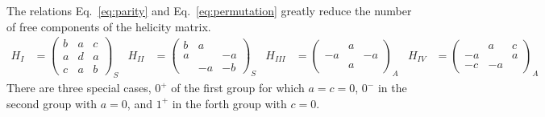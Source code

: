 \documentclass[prd,preprintnumbers,floatfix,
nofootinbib,superscriptaddress]{revtex4}
\newcommand{\I}{\ensuremath{I}}
\newcommand{\II}{\ensuremath{{I\!I}}}
\newcommand{\III}{\ensuremath{{I\!I\!I}}}
\newcommand{\IV}{\ensuremath{{I\!V}}}
\begin{document}
The relations Eq.~\eqref{eq:parity} and Eq.~\eqref{eq:permutation} greatly reduce the number of free components of the helicity matrix.
\begin{align}
  H_\I&=\begin{pmatrix}
    b & a & c\\
    a & d & a\\
    c & a & b
  \end{pmatrix}_S&
  H_\II&=\begin{pmatrix}
    b & a &  \\
    a &   & -a\\
      & -a & -b
  \end{pmatrix}_S&
  H_{\III}&=\begin{pmatrix}
      & a &  \\
    -a &   & -a\\
      & a &
  \end{pmatrix}_A&
  H_{\IV}&=\begin{pmatrix}
      & a & c\\
    -a &   & a\\
    -c & -a &
  \end{pmatrix}_A
\end{align}
There are three special cases, $0^+$ of the first group for which $a=c=0$,
$0^-$ in the second group with $a=0$, and $1^+$ in the forth group with $c=0$.
\end{document}
